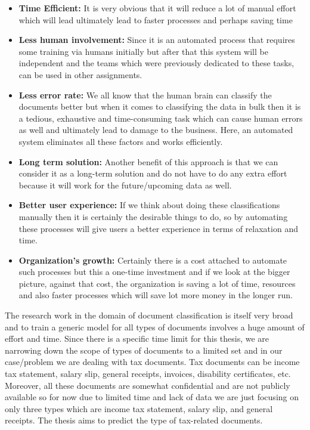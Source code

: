 \begin{itemize}
  \item \textbf{Time Efficient:} It is very obvious that it will reduce a lot of manual effort which will lead ultimately lead to faster processes and perhaps saving time
  
  \item  \textbf{Less human involvement:} Since it is an automated process that requires some training via humans initially but after that this system will be independent and the teams which were previously dedicated to these tasks, can be used in other assignments.
  
  \item \textbf{Less error rate:} We all know that the human brain can classify the documents better but when it comes to classifying the data in bulk then it is a tedious, exhaustive and time-consuming task which can cause human errors as well and ultimately lead to damage to the business. Here, an automated system eliminates all these factors and works efficiently.
  
  \item \textbf{Long term solution:} Another benefit of this approach is that we can consider it as a long-term solution and do not have to do any extra effort because it will work for the future/upcoming data as well.
  
  \item \textbf{Better user experience:} If we think about doing these classifications manually then it is certainly the desirable things to do, so by automating these processes will give users a better experience in terms of relaxation and time.
  
  \item \textbf{Organization's growth:} Certainly there is a cost attached to automate such processes but this a one-time investment and if we look at the bigger picture, against that cost, the organization is saving a lot of time, resources and also faster processes which will save lot more money in the longer run.
\end{itemize}
\par
The research work in the domain of document classification is itself very broad and to train a generic model for all types of documents involves a huge amount of effort and time. Since there is a specific time limit for this thesis, we are narrowing down the scope of types of documents to a limited set and in our case/problem we are dealing with tax documents. Tax documents can be income tax statement, salary slip, general receipts, invoices, disability certificates, etc. Moreover, all these documents are somewhat confidential and are not publicly available so for now due to limited time and lack of data we are just focusing on only three types which are income tax statement, salary slip, and general receipts. The thesis aims to predict the type of tax-related documents. 
